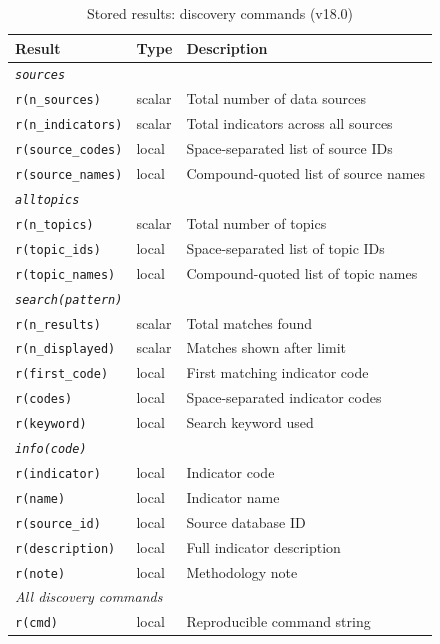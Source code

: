 \documentclass[bib]{statapress}
\begin{document}
\begin{table}[H]
\centering
\caption{Stored results: discovery commands (v18.0)}
\label{tab:stored-discovery}
\begin{tabular}{llp{6.5cm}}
\hline
Result & Type & Description \\
\hline
\multicolumn{3}{l}{\textit{\texttt{sources}}} \\
\texttt{r(n\_sources)} & scalar & Total number of data sources \\
\texttt{r(n\_indicators)} & scalar & Total indicators across all sources \\
\texttt{r(source\_codes)} & local & Space-separated list of source IDs \\
\texttt{r(source\_names)} & local & Compound-quoted list of source names \\
\hline
\multicolumn{3}{l}{\textit{\texttt{alltopics}}} \\
\texttt{r(n\_topics)} & scalar & Total number of topics \\
\texttt{r(topic\_ids)} & local & Space-separated list of topic IDs \\
\texttt{r(topic\_names)} & local & Compound-quoted list of topic names \\
\hline
\multicolumn{3}{l}{\textit{\texttt{search(pattern)}}} \\
\texttt{r(n\_results)} & scalar & Total matches found \\
\texttt{r(n\_displayed)} & scalar & Matches shown after limit \\
\texttt{r(first\_code)} & local & First matching indicator code \\
\texttt{r(codes)} & local & Space-separated indicator codes \\
\texttt{r(keyword)} & local & Search keyword used \\
\hline
\multicolumn{3}{l}{\textit{\texttt{info(code)}}} \\
\texttt{r(indicator)} & local & Indicator code \\
\texttt{r(name)} & local & Indicator name \\
\texttt{r(source\_id)} & local & Source database ID \\
\texttt{r(description)} & local & Full indicator description \\
\texttt{r(note)} & local & Methodology note \\
\hline
\multicolumn{3}{l}{\textit{All discovery commands}} \\
\texttt{r(cmd)} & local & Reproducible command string \\
\hline
\end{tabular}
\end{table}
\end{document}
